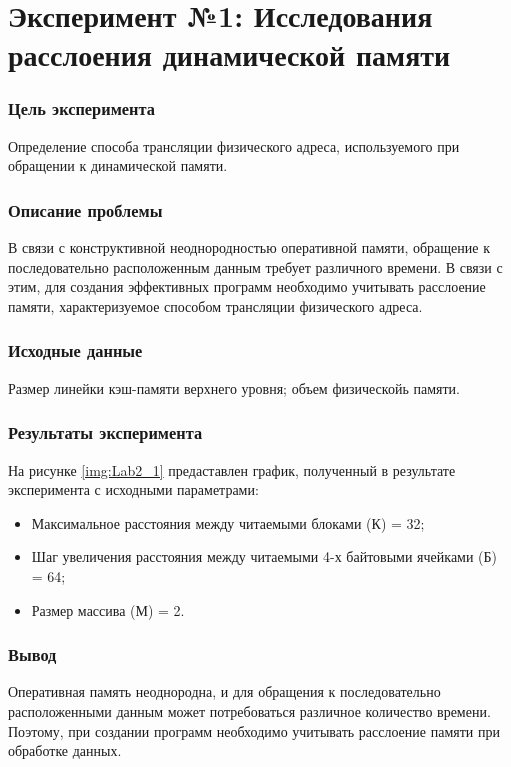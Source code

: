 \chapter*{Эксперимент №1: Исследования расслоения динамической памяти}

\subsection*{Цель эксперимента}
Определение способа трансляции физического адреса, используемого при обращении к динамической памяти. 

\subsection*{Описание проблемы}
В связи с конструктивной неоднородностью оперативной памяти, обращение к последовательно расположенным данным требует различного времени. В связи с этим, для создания эффективных программ необходимо учитывать расслоение памяти, характеризуемое способом трансляции физического адреса.

\subsection*{Исходные данные}
Размер линейки кэш-памяти верхнего уровня; объем физическойь памяти.


\subsection*{Результаты эксперимента}
На рисунке \ref{img:Lab2_1} предаставлен график, полученный в результате эксперимента с исходными параметрами:
\begin{itemize}
	\item Максимальное расстояния между	читаемыми блоками (К) = 32;
	\item Шаг увеличения расстояния между читаемыми 4-х байтовыми ячейками (Б) = 64;
	\item Размер массива (М) = 2.
\end{itemize}


\subsection*{Вывод}
Оперативная память неоднородна, и для обращения к последовательно расположенными данным может потребоваться различное количество времени. Поэтому, при создании программ необходимо учитывать расслоение памяти при обработке данных.


